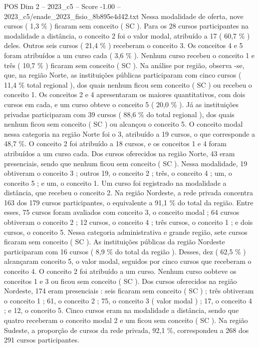 \begin{textsample}{POS Dim 2 – 2023\_c5 – Score -1.00 – 2023\_c5/enade\_2023\_fisio\_8b895e4d42.txt}
Nessa modalidade de oferta, nove cursos ( 1,3 \% ) ficaram sem conceito ( SC ).
Para os 28 cursos participantes na modalidade a distância, o conceito 2 foi o valor modal, atribuído a 17 ( 60,7 \% ) deles.
Outros seis cursos ( 21,4 \% ) receberam o conceito 3.
Os conceitos 4 e 5 foram atribuídos a um curso cada ( 3,6 \% ).
Nenhum curso recebeu o conceito 1 e três ( 10,7 \% ) ficaram sem conceito ( SC ).
Na análise por região, observa -se, que, na região Norte, as instituições públicas participaram com cinco cursos ( 11,4 \% total regional ), dos quais nenhum ficou sem conceito ( SC ) ou recebeu o conceito 1.
Os conceitos 2 e 4 apresentaram os maiores quantitativos, com dois cursos em cada, e um curso obteve o conceito 5 ( 20,0 \% ).
Já as instituições privadas participaram com 39 cursos ( 88,6 \% do total regional ), dos quais nenhum ficou sem conceito ( SC ) ou alcançou o conceito 5.
O conceito modal nessa categoria na região Norte foi o 3, atribuído a 19 cursos, o que corresponde a 48,7 \%.
O conceito 2 foi atribuído a 18 cursos, e os conceitos 1 e 4 foram atribuídos a um curso cada.
Dos cursos oferecidos na região Norte, 43 eram presenciais, sendo que nenhum ficou sem conceito ( SC ).
Nessa modalidade, 19 obtiveram o conceito 3 ; outros 19, o conceito 2 ; três, o conceito 4 ; um, o conceito 5 ; e um, o conceito 1.
Um curso foi registrado na modalidade a distância, que recebeu o conceito 2.
Na região Nordeste, a rede privada concentra 163 dos 179 cursos participantes, o equivalente a 91,1 \% do total da região.
Entre esses, 75 cursos foram avaliados com conceito 3, o conceito modal ; 64 cursos obtiveram o conceito 2 ; 12 cursos, o conceito 4 ; três cursos, o conceito 1 ; e dois cursos, o conceito 5.
Nessa categoria administrativa e grande região, sete cursos ficaram sem conceito ( SC ).
As instituições públicas da região Nordeste participaram com 16 cursos ( 8,9 \% do total da região ).
Desses, dez ( 62,5 \% ) alcançaram conceito 5, o valor modal, seguidos por cinco cursos que receberam o conceito 4.
O conceito 2 foi atribuído a um curso.
Nenhum curso oobteve os conceitos 1 e 3 ou ficou sem conceito ( SC ).
Dos cursos oferecidos na região Nordeste, 174 eram presenciais : seis ficaram sem conceito ( SC ) ; três obtiveram o conceito 1 ; 61, o conceito 2 ; 75, o conceito 3 ( valor modal ) ; 17, o conceito 4 ; e 12, o conceito 5.
Cinco cursos eram na modalidade a distância, sendo que quatro receberam o conceito modal 2 e um ficou sem conceito ( SC ).
Na região Sudeste, a proporção de cursos da rede privada, 92,1 \%, correspondeu a 268 dos 291 cursos participantes.

\end{textsample}
